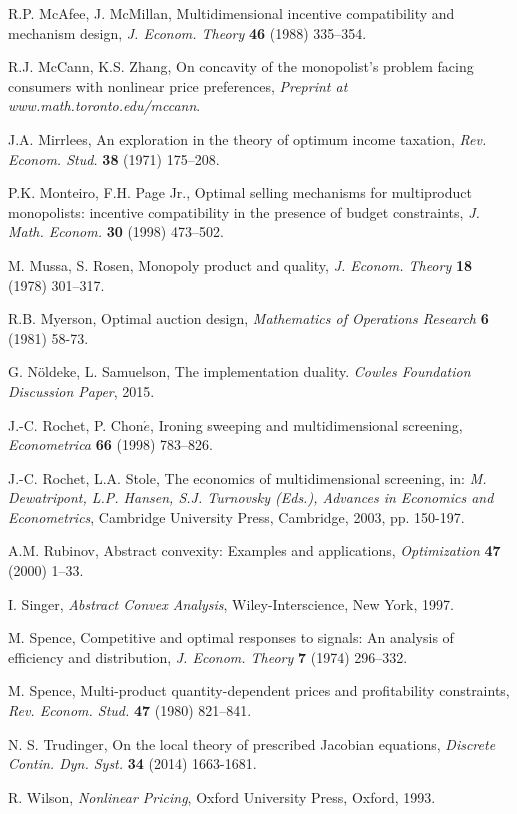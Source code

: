 \documentclass[a4paper, 11pt]{amsart}
\numberwithin{equation}{section}
\theoremstyle{plain}
\theoremstyle{definition}
\theoremstyle{remark}
\begin{document}
\begin{thebibliography}{BCDE}
	
	R.P. McAfee, J. McMillan, 
	Multidimensional incentive compatibility and mechanism design, 
	{\em J. Econom. Theory} {\bf 46} (1988) 335–354.
		
	R.J. McCann, K.S. Zhang,
	On concavity of the monopolist's problem facing consumers with nonlinear price preferences,
	{\em Preprint at {www.math.toronto.edu/mccann}}.
		
	J.A. Mirrlees, 
	An exploration in the theory of optimum income taxation, 
	{\em Rev. Econom. Stud.} {\bf 38} (1971) 175–208.
	

	P.K. Monteiro, F.H. Page Jr., 
	Optimal selling mechanisms for multiproduct monopolists: incentive compatibility in the presence of budget constraints, 
	{\em J. Math. Econom.} {\bf 30} (1998) 473–502.


	M. Mussa, S. Rosen, 
	Monopoly product and quality, 
	{\em J. Econom. Theory} {\bf 18} (1978) 301–317.

{
	R.B. Myerson, 
	Optimal auction design, 
	{\em  Mathematics of Operations Research} {\bf 6} (1981) 58-73.
}

	G. N\"oldeke, L. Samuelson, 
	The implementation duality. 
	{\em Cowles Foundation Discussion Paper}, 2015.	


	J.-C. Rochet, P. Chon$\acute{e}$, 
	Ironing sweeping and multidimensional screening, 
	{\em Econometrica} {\bf 66} (1998) 783–826.
	
	J.-C. Rochet, L.A. Stole, 
	The economics of multidimensional screening, in: 
	{\em M. Dewatripont, L.P. Hansen, S.J. Turnovsky (Eds.),  Advances in Economics and Econometrics}, Cambridge University Press, Cambridge, 2003, pp. 150-197.
	
{	 
	A.M. Rubinov, 
	Abstract convexity: Examples and applications, 
	{\em Optimization} {\bf 47} (2000)  1–33. 
}

{ 
	I. Singer, 
	{\em Abstract Convex Analysis}, Wiley-Interscience, New York, 1997.
}

	M. Spence, 
	Competitive and optimal responses to signals: An analysis of efficiency and distribution, 
	{\em J. Econom. Theory} {\bf 7} (1974) 296–332.

	M. Spence, 
	Multi-product quantity-dependent prices and profitability constraints, 
	{\em Rev. Econom. Stud.} {\bf 47} (1980) 821–841.
	
	N. S. Trudinger, 
	On the local theory of prescribed Jacobian equations, 
	{\em Discrete Contin. Dyn. Syst.} {\bf 34} (2014) 1663-1681.



	R. Wilson, 
	{\em Nonlinear Pricing}, 
	Oxford University Press, Oxford, 1993.

	
	
\end{thebibliography}


\bigskip
\end{document}
